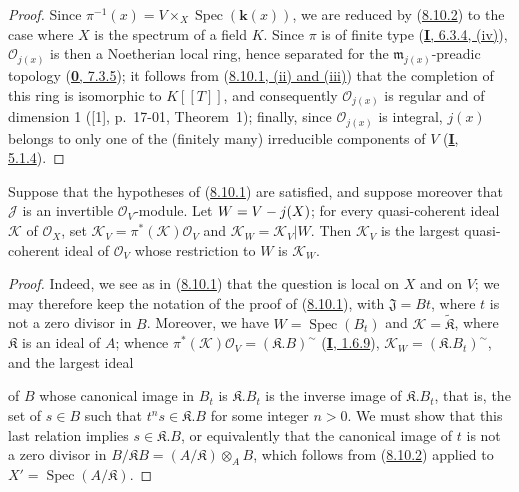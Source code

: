 \begin{proof}
Since $\pi^{-1}(x)=V\times_X\operatorname{Spec}(\boldsymbol{k}(x))$, we are reduced by
(\hyperref[II.8.10.2]{8.10.2}) to the case where $X$ is the spectrum of a
field $K$. Since $\pi$ is of finite type
(\hyperref[I.6.3.4]{\textbf{I}, 6.3.4, (iv)}), $\mathcal{O}_{j(x)}$ is then a
Noetherian local ring, hence separated for the
$\mathfrak{m}_{j(x)}$-preadic topology
(\hyperref[0.7.3.5]{\textbf{0}, 7.3.5}); it follows from
(\hyperref[II.8.10.1]{8.10.1, (ii) and (iii)}) that the completion of this
ring is isomorphic to $K[[T]]$, and consequently $\mathcal{O}_{j(x)}$ is
regular and of dimension 1 ([1], p.~17-01, Theorem~1); finally, since
$\mathcal{O}_{j(x)}$ is integral, $j(x)$ belongs to only one of the
(finitely many) irreducible components of $V$
(\hyperref[I.5.1.4]{\textbf{I}, 5.1.4}).
\end{proof}

\begin{corollary}[8.10.4]
\label{II.8.10.4}
Suppose that the hypotheses of \textup{(\hyperref[II.8.10.1]{8.10.1})} are
satisfied, and suppose moreover that $\mathcal{J}$ is an invertible
$\mathcal{O}_V$-module. Let $W=V- j(X)$; for every quasi-coherent ideal
$\mathcal{K}$ of $\mathcal{O}_X$, set
$\mathcal{K}_V=\pi^*(\mathcal{K})\mathcal{O}_V$ and
$\mathcal{K}_W=\mathcal{K}_V|W$. Then $\mathcal{K}_V$ is the largest
quasi-coherent ideal of $\mathcal{O}_V$ whose restriction to $W$ is
$\mathcal{K}_W$.
\end{corollary}

\begin{proof}
Indeed, we see as in (\hyperref[II.8.10.1]{8.10.1}) that the question
is local on $X$ and on $V$; we may therefore keep the notation of the
proof of (\hyperref[II.8.10.1]{8.10.1}), with
$\mathfrak{J}=Bt$, where $t$ is not a zero divisor in $B$. Moreover, we have
$W=\operatorname{Spec}(B_t)$ and $\mathcal{K}=\widetilde{\mathfrak{K}}$, where
$\mathfrak{K}$ is an ideal of $A$; whence
$\pi^*(\mathcal{K})\mathcal{O}_V=(\mathfrak{K}.B)^{\sim}$
(\hyperref[I.1.6.9]{\textbf{I}, 1.6.9}),
$\mathcal{K}_W=(\mathfrak{K}.B_t)^{\sim}$, and the largest ideal

of $B$ whose canonical image in $B_t$ is $\mathfrak{K}.B_t$ is the inverse
image of $\mathfrak{K}.B_t$, that is, the set of $s\in B$ such
that $t^ns\in\mathfrak{K}.B$ for some integer $n>0$. We must show that
this last relation implies $s\in\mathfrak{K}.B$, or equivalently that the
canonical image of $t$ is not a zero divisor in
$B/\mathfrak{K}B=(A/\mathfrak{K})\otimes_A B$, which follows from
(\hyperref[II.8.10.2]{8.10.2}) applied to
$X'=\operatorname{Spec}(A/\mathfrak{K})$.
\end{proof}

